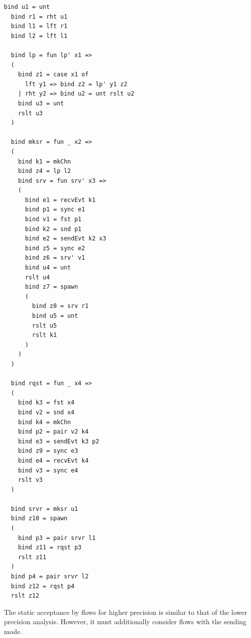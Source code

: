 \documentclass[letterpaper, 11pt]{extarticle}
\begin{document}
\begin{lstlisting}[language=normal_lang, mathescape]
  bind u1 = unt
  bind r1 = rht u1
  bind l1 = lft r1
  bind l2 = lft l1

  bind lp = fun lp' x1 => 
  (
    bind z1 = case x1 of 
      lft y1 => bind z2 = lp' y1 z2
    | rht y2 => bind u2 = unt rslt u2
    bind u3 = unt
    rslt u3
  )

  bind mksr = fun _ x2 => 
  (
    bind k1 = mkChn
    bind z4 = lp l2
    bind srv = fun srv' x3 =>
    (
      bind e1 = recvEvt k1
      bind p1 = sync e1
      bind v1 = fst p1
      bind k2 = snd p1 
      bind e2 = sendEvt k2 x3
      bind z5 = sync e2
      bind z6 = srv' v1
      bind u4 = unt
      rslt u4
      bind z7 = spawn
      (
        bind z8 = srv r1
        bind u5 = unt
        rslt u5
        rslt k1
      )
    )
  )

  bind rqst = fun _ x4 =>
  (
    bind k3 = fst x4
    bind v2 = snd x4
    bind k4 = mkChn
    bind p2 = pair v2 k4
    bind e3 = sendEvt k3 p2
    bind z9 = sync e3
    bind e4 = recvEvt k4
    bind v3 = sync e4
    rslt v3
  )

  bind srvr = mksr u1
  bind z10 = spawn
  ( 
    bind p3 = pair srvr l1
    bind z11 = rqst p3
    rslt z11
  )
  bind p4 = pair srvr l2
  bind z12 = rqst p4
  rslt z12
\end{lstlisting}


The static acceptance by flows for higher precision is similar to that of the lower precision analysis.
However, it must additionally consider flows with the sending mode. 
\end{document}
